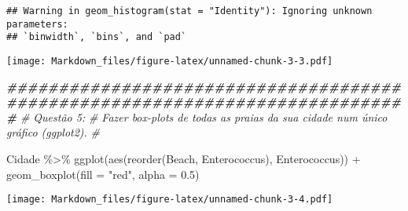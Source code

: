 \documentclass[
]{article}
\newenvironment{Shaded}{\begin{snugshade}}{\end{snugshade}}
\newcommand{\AttributeTok}[1]{\textcolor[rgb]{0.77,0.63,0.00}{#1}}
\newcommand{\CommentTok}[1]{\textcolor[rgb]{0.56,0.35,0.01}{\textit{#1}}}
\newcommand{\DocumentationTok}[1]{\textcolor[rgb]{0.56,0.35,0.01}{\textbf{\textit{#1}}}}
\newcommand{\FloatTok}[1]{\textcolor[rgb]{0.00,0.00,0.81}{#1}}
\newcommand{\FunctionTok}[1]{\textcolor[rgb]{0.00,0.00,0.00}{#1}}
\newcommand{\NormalTok}[1]{#1}
\newcommand{\SpecialCharTok}[1]{\textcolor[rgb]{0.00,0.00,0.00}{#1}}
\newcommand{\StringTok}[1]{\textcolor[rgb]{0.31,0.60,0.02}{#1}}
\begin{document}
\begin{verbatim}
## Warning in geom_histogram(stat = "Identity"): Ignoring unknown parameters:
## `binwidth`, `bins`, and `pad`
\end{verbatim}

\texttt{[image: Markdown\_files/figure-latex/unnamed-chunk-3-3.pdf]}

\begin{Shaded}
\begin{Highlighting}[]
\DocumentationTok{\#\#\#\#\#\#\#\#\#\#\#\#\#\#\#\#\#\#\#\#\#\#\#\#\#\#\#\#\#\#\#\#\#\#\#\#\#\#\#\#\#\#\#\#\#\#\#\#\#\#\#\#\#\#\#\#\#\#\#\#\#\#\#\#\#\#\#\#\#\#\#\#\#\#\#\#\# }
\CommentTok{\# Questão 5:}
\CommentTok{\#   Fazer box{-}plots de todas as praias da sua cidade num único gráfico (ggplot2).}
\CommentTok{\#}


\NormalTok{Cidade }\SpecialCharTok{\%\textgreater{}\%} \FunctionTok{ggplot}\NormalTok{(}\FunctionTok{aes}\NormalTok{(}\FunctionTok{reorder}\NormalTok{(Beach, Enterococcus), Enterococcus)) }\SpecialCharTok{+} \FunctionTok{geom\_boxplot}\NormalTok{(}\AttributeTok{fill =} \StringTok{"red"}\NormalTok{, }\AttributeTok{alpha =} \FloatTok{0.5}\NormalTok{)}
\end{Highlighting}
\end{Shaded}

\texttt{[image: Markdown\_files/figure-latex/unnamed-chunk-3-4.pdf]}
\end{document}
